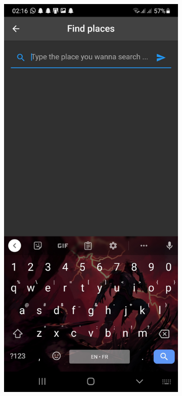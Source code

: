 \begin{figure}[!htbp]
    \centering
    \begin{subfigure}{.3\linewidth}
        \centering
         \includegraphics[width=\textwidth]{assets/app/search/search.jpg}

\end{subfigure}
\end{figure}
